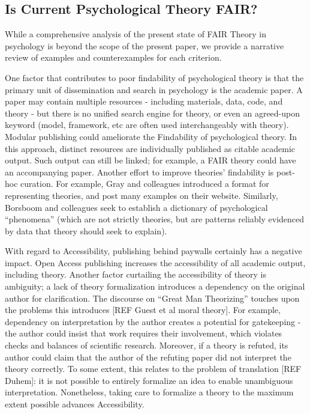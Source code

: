 \documentclass[
  man]{apa6}
\newenvironment{lltable}{\begin{landscape}\centering\begin{ThreePartTable}}{\end{ThreePartTable}\end{landscape}}
\begin{document}
\begin{lltable}
\end{lltable}

\subsection{Is Current Psychological Theory FAIR?}\label{is-current-psychological-theory-fair}

While a comprehensive analysis of the present state of FAIR Theory in psychology is beyond the scope of the present paper,
we provide a narrative review of examples and counterexamples for each criterion.

One factor that contributes to poor findability of psychological theory is that the primary unit of dissemination and search in psychology is the academic paper.
A paper may contain multiple resources - including materials, data, code, and theory - but there is no unified search engine for theory,
or even an agreed-upon keyword (model, framework, etc are often used interchangeably with theory).
Modular publishing could ameliorate the Findability of psychological theory.
In this approach, distinct resources are individually published as citable academic output.
Such output can still be linked; for example, a FAIR theory could have an accompanying paper.
Another effort to improve theories' findability is post-hoc curation.
For example, Gray and colleagues introduced a format for representing theories,
and post many examples on their website.
Similarly, Borsboom and colleagues seek to establish a dictionary of psychological ``phenomena'' (which are not strictly theories, but are patterns reliably evidenced by data that theory should seek to explain).

With regard to Accessibility, publishing behind paywalls certainly has a negative impact.
Open Access publishing increases the accessibility of all academic output, including theory.
Another factor curtailing the accessibility of theory is ambiguity;
a lack of theory formalization introduces a dependency on the original author for clarification.
The discourse on ``Great Man Theorizing'' touches upon the problems this introduces {[}REF Guest et al moral theory{]}.
For example, dependency on interpretation by the author creates a potential for gatekeeping - the author could insist that work requires their involvement, which violates checks and balances of scientific research.
Moreover, if a theory is refuted, its author could claim that the author of the refuting paper did not interpret the theory correctly.
To some extent, this relates to the problem of translation {[}REF Duhem{]}:
it is not possible to entirely formalize an idea to enable unambiguous interpretation.
Nonetheless, taking care to formalize a theory to the maximum extent possible advances Accessibility.
\end{document}
